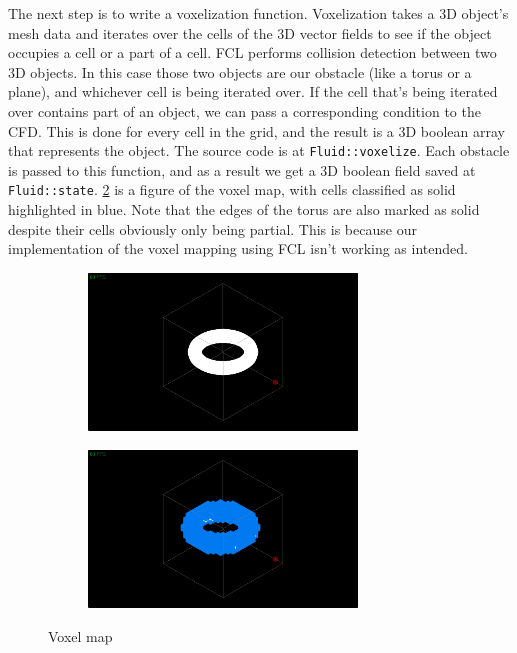 \documentclass[a4paper,12pt,titlepage]{article}
\begin{document}
The next step is to write a voxelization function. Voxelization takes a 3D
object's mesh data and iterates over the cells of the 3D
vector fields to see if the object occupies a cell or a part of a cell. FCL performs
collision detection between two 3D objects. In this case those two objects are
our obstacle (like a torus or a plane), and whichever cell is being iterated over.
If the cell that's being iterated over contains part of an object, we can pass
a corresponding condition to the CFD. This is done for every cell in the grid,
and the result is a 3D boolean array that represents the object. The source code
is at \lstinline{Fluid::voxelize}. Each obstacle is passed to this function, and
as a result we get a 3D boolean field saved at \lstinline{Fluid::state}.
\ref{fig:voxelmap} is a figure of the voxel map, with cells classified as solid highlighted in
blue. Note that the edges of the torus are also marked as solid despite their cells
obviously only being partial. This is because our implementation of the voxel mapping
using FCL isn't working as intended.

\begin{figure}[H]
    \centering
    \begin{subfigure}[t]{0.45\textwidth}
        \centering
        \includegraphics[height=1.65in]{resources/voxelize1.png}
		\caption{}
    \end{subfigure}
    \hfill
    \begin{subfigure}[t]{0.45\textwidth}
        \centering
        \includegraphics[height=1.65in]{resources/voxelize2.png}
		\caption{}
		\label{fig:voxelmap}
	\end{subfigure} 
    \caption{Voxel map}
\end{figure}
\end{document}
